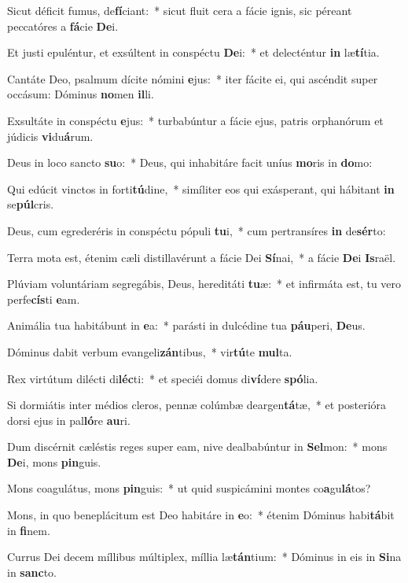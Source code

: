 \item Sicut déficit fumus, de\textbf{fí}ciant:~* sicut fluit cera a fácie ignis, sic péreant peccatóres a \textbf{fá}cie \textbf{De}i.
\item Et justi epuléntur, et exsúltent in conspéctu \textbf{De}i:~* et delecténtur \textbf{in} læ\textbf{tí}tia.
\item Cantáte Deo, psalmum dícite nómini \textbf{e}jus:~* iter fácite ei, qui ascéndit super occásum: Dóminus \textbf{no}men \textbf{il}li.
\item Exsultáte in conspéctu \textbf{e}jus:~* turbabúntur a fácie ejus, patris orphanórum et júdicis \textbf{vi}du\textbf{á}rum.
\item Deus in loco sancto \textbf{su}o:~* Deus, qui inhabitáre facit uníus \textbf{mo}ris in \textbf{do}mo:
\item Qui edúcit vinctos in forti\textbf{tú}dine,~* simíliter eos qui exásperant, qui hábitant \textbf{in} se\textbf{púl}cris.
\item Deus, cum egrederéris in conspéctu pópuli \textbf{tu}i,~* cum pertransíres \textbf{in} de\textbf{sér}to:
\item Terra mota est, étenim cæli distillavérunt a fácie Dei \textbf{Sí}nai,~* a fácie \textbf{De}i \textbf{Is}raël.
\item Plúviam voluntáriam segregábis, Deus, hereditáti \textbf{tu}æ:~* et infirmáta est, tu vero perfe\textbf{cís}ti \textbf{e}am.
\item Animália tua habitábunt in \textbf{e}a:~* parásti in dulcédine tua \textbf{páu}peri, \textbf{De}us.
\item Dóminus dabit verbum evangeli\textbf{zán}tibus,~* vir\textbf{tú}te \textbf{mul}ta.
\item Rex virtútum dilécti di\textbf{léc}ti:~* et speciéi domus di\textbf{ví}dere \textbf{spó}lia.
\item Si dormiátis inter médios cleros, pennæ colúmbæ deargen\textbf{tá}tæ,~* et posterióra dorsi ejus in pal\textbf{ló}re \textbf{au}ri.
\item Dum discérnit cæléstis reges super eam, nive dealbabúntur in \textbf{Sel}mon:~* mons \textbf{De}i, mons \textbf{pin}guis.
\item Mons coagulátus, mons \textbf{pin}guis:~* ut quid suspicámini montes co\textbf{a}gu\textbf{lá}tos?
\item Mons, in quo beneplácitum est Deo habitáre in \textbf{e}o:~* étenim Dóminus habi\textbf{tá}bit in \textbf{fi}nem.
\item Currus Dei decem míllibus múltiplex, míllia læ\textbf{tán}tium:~* Dóminus in eis in \textbf{Si}na in \textbf{sanc}to.
